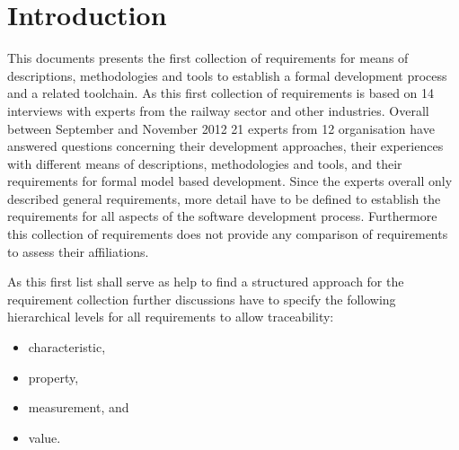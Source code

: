 \chapter{Introduction}

This documents presents the first collection of requirements for means of descriptions, methodologies and tools to establish a formal development process and a related toolchain. As this first collection of requirements is based on 14 interviews with experts from the railway sector and other industries. Overall between September and November 2012 21 experts from 12 organisation have answered questions concerning their development approaches, their experiences with different means of descriptions, methodologies and tools, and their requirements for formal model based development. Since the experts overall only described general requirements, more detail have to be defined to establish the requirements for all aspects of the software development process. Furthermore this collection of requirements does not provide any comparison of requirements to assess  their affiliations.

As this first list shall serve as help to find a structured approach for the requirement collection further discussions have to specify the following hierarchical levels for all requirements to allow traceability:
\vspace{-10pt}
\begin{itemize}
 \item characteristic,
\item property,
\item measurement, and
\item value.
\end{itemize}

